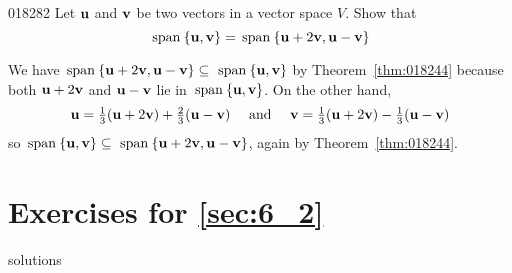 \begin{example}{}{018282}
Let $\textbf{u}$ and $\textbf{v}$ be two vectors in a vector space $V$. Show that
\begin{equation*}
\thinspace\operatorname{span\medspace}\{\textbf{u}, \textbf{v}\} = \thinspace\operatorname{span\medspace}\{\textbf{u} + 2\textbf{v}, \textbf{u} - \textbf{v} \}
\end{equation*}
\begin{solution}
We have $\thinspace\operatorname{span\medspace}\{\textbf{u} + 2\textbf{v}, \textbf{u} - \textbf{v}\} \subseteq$ $\thinspace\operatorname{span\medspace}\{\textbf{u}, \textbf{v}\}$ by Theorem~\ref{thm:018244} because both $\textbf{u} + 2\textbf{v}$ and $\textbf{u} - \textbf{v}$ lie in $\thinspace\operatorname{span\medspace}\{\textbf{u}, \textbf{v}\}$. On the other hand,
\begin{equation*}
\textbf{u} = \tfrac{1}{3}(\textbf{u} + 2\textbf{v}) + \tfrac{2}{3}(\textbf{u} - \textbf{v}) \quad \mbox{ and } \quad \textbf{v} = \tfrac{1}{3}(\textbf{u} + 2\textbf{v}) - \tfrac{1}{3}(\textbf{u} - \textbf{v})
\end{equation*}
so $\thinspace\operatorname{span\medspace}\{\textbf{u}, \textbf{v}\} \subseteq$ $\thinspace\operatorname{span\medspace}\{\textbf{u} + 2\textbf{v}, \textbf{u} - \textbf{v}\}$, again by Theorem~\ref{thm:018244}.
\end{solution}
\end{example}

\section*{Exercises for \ref{sec:6_2}}

\begin{Filesave}{solutions}
\end{Filesave}

